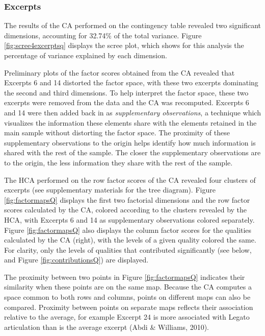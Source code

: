 \documentclass[
  english,
  man,floatsintext]{apa6}
\begin{document}
\hypertarget{excerpts}{%
\subsubsection{Excerpts}\label{excerpts}}

The results of the CA performed on the contingency table revealed two significant dimensions, accounting for 32.74\% of the total variance. Figure \ref{fig:scree4excerptsq} displays the scree plot, which shows for this analysis the percentage of variance explained by each dimension.

Preliminary plots of the factor scores obtained from the CA revealed that Excerpts 6 and 14 distorted the factor space, with these two excerpts dominating the second and third dimensions. To help interpret the factor space, these two excerpts were removed from the data and the CA was recomputed. Excerpts 6 and 14 were then added back in as \emph{supplementary observations}, a technique which visualizes the information these elements share with the elements retained in the main sample without distorting the factor space. The proximity of these supplementary observations to the origin helps identify how much information is shared with the rest of the sample. The closer the supplementary observations are to the origin, the less information they share with the rest of the sample.

The HCA performed on the row factor scores of the CA revealed four clusters of excerpts (see supplementary materials for the tree diagram). Figure \ref{fig:factormapsQ} displays the first two factorial dimensions and the row factor scores calculated by the CA, colored according to the clusters revealed by the HCA, with Excerpts 6 and 14 as supplementary observations colored separately. Figure \ref{fig:factormapsQ} also displays the column factor scores for the qualities calculated by the CA (right), with the levels of a given quality colored the same. For clarity, only the levels of qualities that contributed significantly (see below, and Figure \ref{fig:contributionsQ}) are displayed.

The proximity between two points in Figure \ref{fig:factormapsQ} indicates their similarity when these points are on the same map. Because the CA computes a space common to both rows and columns, points on different maps can also be compared. Proximity between points on separate maps reflects their association relative to the average, for example Excerpt 24 is more associated with Legato articulation than is the average excerpt (Abdi \& Williams, 2010).
\end{document}
